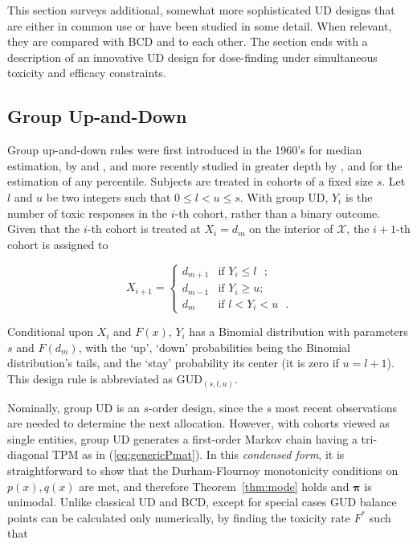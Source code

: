 This section surveys additional, somewhat more sophisticated UD designs that are either in common use or have been studied in some detail. When relevant, they are compared with BCD and to each other. The section ends with a description of an innovative UD design for dose-finding under simultaneous toxicity and efficacy constraints.

\subsection{Group Up-and-Down}\label{sec:gud}

Group up-and-down rules were first introduced in the 1960's for median estimation, by \cite{Weth:Sequ:1963} and \cite{Tsut:asym:1967,Tsut:rand:1967}, and more recently studied in greater depth by \cite{Gezm:Flou:Grou:2006}, \cite{Ivan:esca:2006} and \cite{Bald:Bort:Giov:2008} for the estimation of any percentile. Subjects are treated in cohorts of a fixed size $s$. Let $l$ and $u$ be two integers such that $0\le l< u\le s$. With group UD, $Y_i$ is the number of toxic responses in the $i$-th cohort, rather than a binary outcome. Given that the $i$-th cohort is treated at $X_i=d_m$ on the interior of $\mathcal{X}$, the $i+1$-th cohort is assigned to

\begin{equation*}
X_{i+1}=
\begin{cases}
d_{m+1} &\textrm{if $Y_i\le l$ };\\
d_{m-1} &\textrm{if $Y_i\ge u$};\\
d_m &\textrm{if $l<Y_i<u$ }.
\end{cases}
\end{equation*}

Conditional upon $X_i$ and $F(x)$, $Y_i$ has a Binomial distribution with parameters $s$ and $F(d_m)$, with the `up', `down' probabilities being the Binomial distribution's tails, and the `stay' probability its center (it is zero if $u=l+1$). This design rule is abbreviated as GUD$_{(s,l,u)}$.

Nominally, group UD is an $s$-order design, since the $s$ most recent observations are needed to determine the next allocation. However, with cohorts viewed as single entities, group UD generates a first-order Markov chain having a tri-diagonal TPM as in (\ref{eq:genericPmat}). In this \emph{condensed form}, it is straightforward to show that the Durham-Flournoy monotonicity conditions on $p(x),q(x)$ are met, and therefore Theorem~\ref{thm:mode} holds and $\boldsymbol{\pi}$ is unimodal. Unlike classical UD and BCD, except for special cases GUD balance points can be calculated only numerically, by finding the toxicity rate $F^*$ such that

